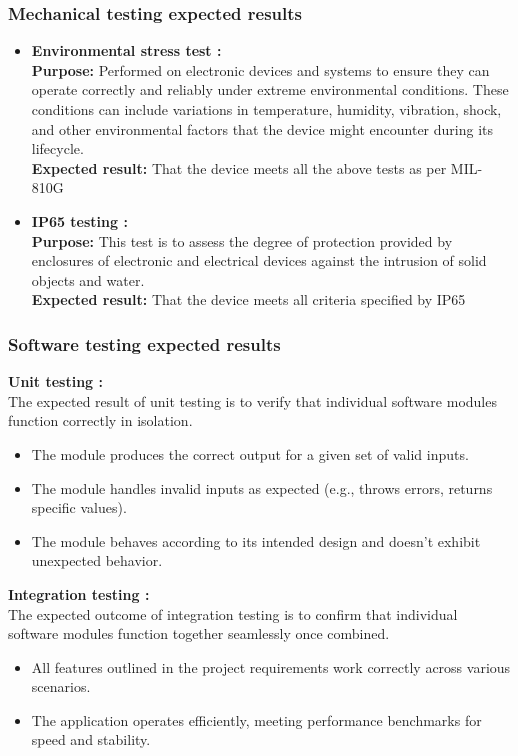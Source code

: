 \documentclass[a4paper,12pt]{article}
\begin{document}
	\subsubsection{Mechanical testing expected results}
		
	\begin{itemize}
		\item \textbf{Environmental stress test : } \\
		\textbf{Purpose:} 	Performed on electronic devices and systems to ensure they can operate correctly and reliably under extreme environmental conditions. These conditions can include variations in temperature, humidity, vibration, shock, and other environmental factors that the device might encounter during its lifecycle.\\
		\textbf {Expected result:} That the device meets all the above tests as per  MIL-810G
		\item \textbf{IP65 testing : }\\
		\textbf {Purpose:} This test is to assess the degree of protection provided by enclosures of electronic and electrical devices against the intrusion of solid objects and water.\\
		\textbf {Expected result:}  That the device meets all criteria specified by IP65
	\end{itemize}

	\subsubsection{Software testing expected results}
	
		\textbf{Unit testing :}
		\\
		The expected result of unit testing is to verify that individual software modules function correctly in isolation.
		\begin{itemize}
			\item The module produces the correct output for a given set of valid inputs.
			\item The module handles invalid inputs as expected (e.g., throws errors, returns specific values).
			\item The module behaves according to its intended design and doesn't exhibit unexpected behavior.
		\end{itemize}
	\textbf{Integration testing :}
	\\
	The expected outcome of integration testing is to confirm that individual software modules function together seamlessly once combined.
	\begin{itemize}
		\item All features outlined in the project requirements work correctly across various scenarios.
		\item The application operates efficiently, meeting performance benchmarks for speed and stability.
		
	\end{itemize}
\end{document}
